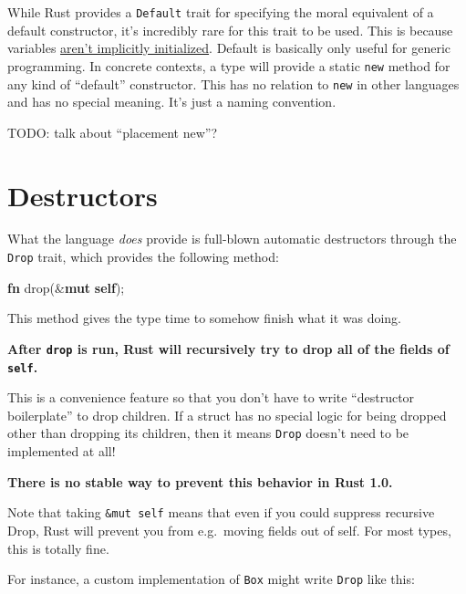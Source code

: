 \documentclass[a4paper,]{book}
\newenvironment{Shaded}{\begin{snugshade}}{\end{snugshade}}
\newcommand{\KeywordTok}[1]{\textcolor[rgb]{0.13,0.29,0.53}{\textbf{{#1}}}}
\newcommand{\NormalTok}[1]{{#1}}
\begin{document}
While Rust provides a \texttt{Default} trait for specifying the moral
equivalent of a default constructor, it's incredibly rare for this trait
to be used. This is because variables
\protect\hyperlink{sec--uninitialized}{aren't implicitly initialized}.
Default is basically only useful for generic programming. In concrete
contexts, a type will provide a static \texttt{new} method for any kind
of ``default'' constructor. This has no relation to \texttt{new} in
other languages and has no special meaning. It's just a naming
convention.

TODO: talk about ``placement new''?

\section{Destructors}\label{sec--destructors}

What the language \emph{does} provide is full-blown automatic
destructors through the \texttt{Drop} trait, which provides the
following method:

\begin{Shaded}
\begin{Highlighting}[]
\KeywordTok{fn} \NormalTok{drop(&}\KeywordTok{mut} \KeywordTok{self}\NormalTok{);}
\end{Highlighting}
\end{Shaded}

This method gives the type time to somehow finish what it was doing.

\textbf{After \texttt{drop} is run, Rust will recursively try to drop
all of the fields of \texttt{self}.}

This is a convenience feature so that you don't have to write
``destructor boilerplate'' to drop children. If a struct has no special
logic for being dropped other than dropping its children, then it means
\texttt{Drop} doesn't need to be implemented at all!

\textbf{There is no stable way to prevent this behavior in Rust 1.0.}

Note that taking \texttt{\&mut\ self} means that even if you could
suppress recursive Drop, Rust will prevent you from e.g.~moving fields
out of self. For most types, this is totally fine.

For instance, a custom implementation of \texttt{Box} might write
\texttt{Drop} like this:
\end{document}
